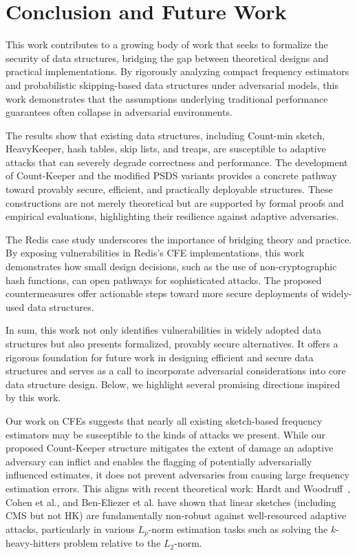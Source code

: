 \chapter{Conclusion and Future Work}\label{chap:conclusion}

This work contributes to a growing body of work that seeks to formalize the security of data structures, bridging the gap between theoretical designs and practical implementations. By rigorously analyzing compact frequency estimators and probabilistic skipping-based data structures under adversarial models, this work demonstrates that the assumptions underlying traditional performance guarantees often collapse in adversarial environments.

The results show that existing data structures, including Count-min sketch, HeavyKeeper, hash tables, skip lists, and treaps, are susceptible to adaptive attacks that can severely degrade correctness and performance. The development of Count-Keeper and the modified PSDS variants provides a concrete pathway toward provably secure, efficient, and practically deployable structures. These constructions are not merely theoretical but are supported by formal proofs and empirical evaluations, highlighting their resilience against adaptive adversaries.

The Redis case study underscores the importance of bridging theory and practice. By exposing vulnerabilities in Redis’s CFE implementations, this work demonstrates how small design decisions, such as the use of non-cryptographic hash functions, can open pathways for sophisticated attacks. The proposed countermeasures offer actionable steps toward more secure deployments of widely-used data structures.

In sum, this work not only identifies vulnerabilities in widely adopted data structures but also presents formalized, provably secure alternatives. It offers a rigorous foundation for future work in designing efficient and secure data structures and serves as a call to incorporate adversarial considerations into core data structure design. Below, we highlight several promising directions inspired by this work.

Our work on CFEs suggests that nearly all existing sketch-based frequency estimators may be susceptible to the kinds of attacks we present. While our proposed Count-Keeper structure mitigates the extent of damage an adaptive adversary can inflict and enables the flagging of potentially adversarially influenced estimates, it does not prevent adversaries from causing large frequency estimation errors. This aligns with recent theoretical work: Hardt and Woodruff~\cite{hardt2013}, Cohen et al.\cite{cohen2022robust}, and Ben-Eliezer et al.\cite{BenEliezer2022} have shown that linear sketches (including CMS but not HK) are fundamentally non-robust against well-resourced adaptive attacks, particularly in various $L_p$-norm estimation tasks such as solving the $k$-heavy-hitters problem relative to the $L_2$-norm.

